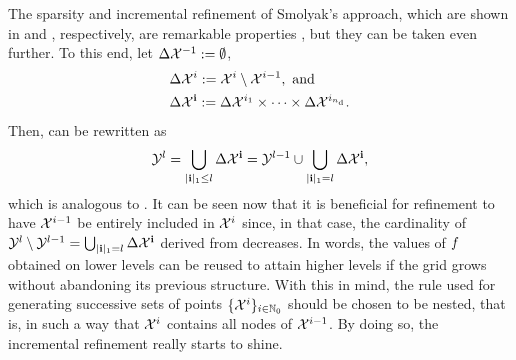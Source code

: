 The sparsity and incremental refinement of Smolyak's approach, which are shown
in  and , respectively, are
remarkable properties \perse, but they can be taken even further. To this end,
let $\Delta\mathcal{X}^{-1} := \emptyset$,
\begin{align*}
  & \Delta\mathcal{X}^i := \mathcal{X}^i \setminus \mathcal{X}^{i - 1}, \text{ and} \\
  & \Delta\mathcal{X}^{\mathbf{i}} := \Delta\mathcal{X}^{i_1} \times \cdots \times \Delta\mathcal{X}^{i_{n_\text{d}}}.
\end{align*}
Then,  can be rewritten as
\begin{equation} \elab{smolyak-grid-incremental}
  \Y^l = \bigcup_{|\vi|_1 \leq l} \Delta\X^\vi = \Y^{l - 1} \cup \bigcup_{|\vi|_1 = l} \Delta\X^\vi,
\end{equation}
which is analogous to . It can be seen now that it is
beneficial for refinement to have $\mathcal{X}^{i - 1}$ be entirely included in $\mathcal{X}^i$
since, in that case, the cardinality of $\mathcal{Y}^l \setminus \mathcal{Y}^{l - 1} =
\bigcup_{|\mathbf{i}|_1 = l} \Delta\mathcal{X}^{\mathbf{i}}$ derived from 
decreases. In words, the values of $f$ obtained on lower levels can be reused
to attain higher levels if the grid grows without abandoning its previous
structure. With this in mind, the rule used for generating successive sets of
points $\{ \mathcal{X}^i \}_{i \in \mathbb{N}_0}$ should be chosen to be nested, that is, in
such a way that $\mathcal{X}^i$ contains all nodes of $\mathcal{X}^{i - 1}$. By doing so, the
incremental refinement really starts to shine.

